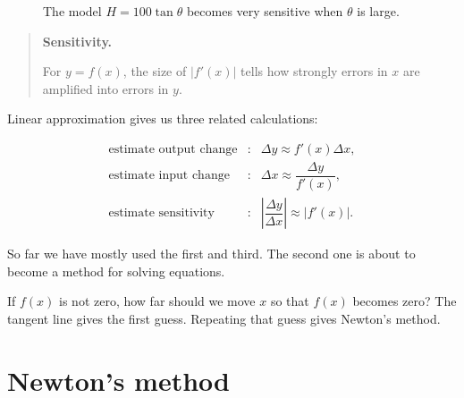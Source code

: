 \begin{figure}[h]
\centering
{}
\caption{The model \(H=100\tan\theta\) becomes very sensitive when \(\theta\) is large.}
\label{fig:angle-height-sensitivity}
\end{figure}

\begin{quote}
\textbf{Sensitivity.}

For \(y=f(x)\), the size of \(|f'(x)|\) tells how strongly errors in \(x\) are amplified
into errors in \(y\).
\end{quote}

Linear approximation gives us three related calculations:

\[
\begin{array}{ccl}
\text{estimate output change} &:& \Delta y\approx f'(x)\Delta x,\\[4pt]
\text{estimate input change} &:& \Delta x\approx \dfrac{\Delta y}{f'(x)},\\[10pt]
\text{estimate sensitivity} &:& \left|\dfrac{\Delta y}{\Delta x}\right|\approx |f'(x)|.
\end{array}
\]

So far we have mostly used the first and third.  The second one is about to become a
method for solving equations.

If \(f(x)\) is not zero, how far should we move \(x\) so that \(f(x)\) becomes zero?
The tangent line gives the first guess.  Repeating that guess gives Newton's method.

\section{Newton's method}
\label{sec:newtons-method}

